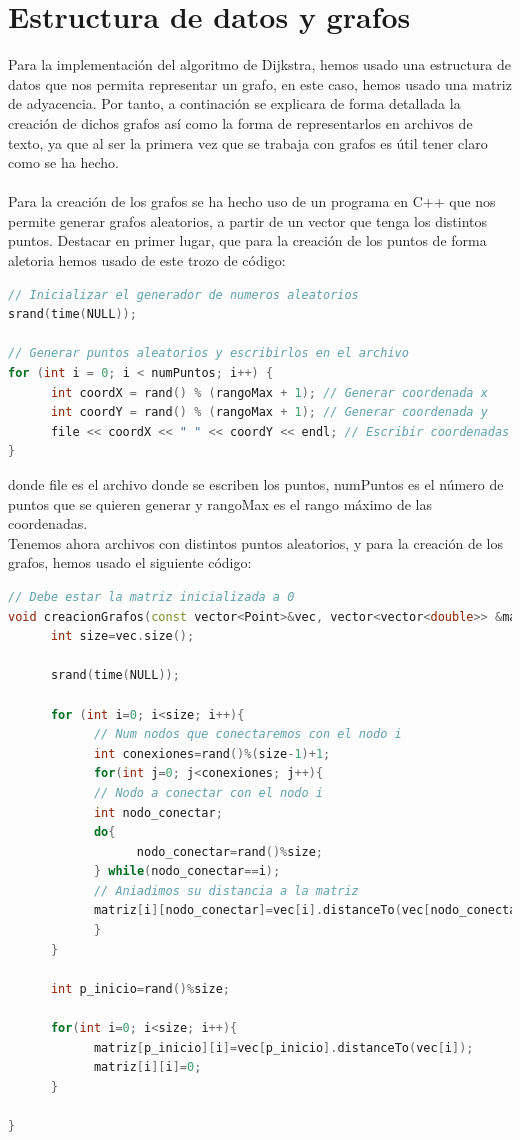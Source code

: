 \documentclass[11pt,openany]{book}
\begin{document}
\section{Estructura de datos y grafos}
Para la implementación del algoritmo de Dijkstra, hemos usado una estructura de datos que nos permita representar un grafo, en este caso,
hemos usado una matriz de adyacencia. Por tanto, a continación se explicara de forma detallada la creación de dichos grafos así como la forma de 
representarlos en archivos de texto, ya que al ser la primera vez que se trabaja con grafos es útil tener
claro como se ha hecho. \\ \\
Para la creación de los grafos se ha hecho uso de un programa en C++ que nos permite generar grafos aleatorios, a partir
de un vector que tenga los distintos puntos. Destacar en primer lugar, que para la creación de los puntos de forma aletoria hemos usado 
de este trozo de código:
\begin{lstlisting}[language=C++]
// Inicializar el generador de numeros aleatorios
srand(time(NULL));

// Generar puntos aleatorios y escribirlos en el archivo
for (int i = 0; i < numPuntos; i++) {
      int coordX = rand() % (rangoMax + 1); // Generar coordenada x
      int coordY = rand() % (rangoMax + 1); // Generar coordenada y
      file << coordX << " " << coordY << endl; // Escribir coordenadas al archivo
}
\end{lstlisting}
donde file es el archivo donde se escriben los puntos, numPuntos es el número de puntos que se quieren generar y rangoMax es el rango
máximo de las coordenadas. \\
Tenemos ahora archivos con distintos puntos aleatorios, y para la creación de los grafos, hemos usado el siguiente código:
\begin{lstlisting}[language=C++]
// Debe estar la matriz inicializada a 0
void creacionGrafos(const vector<Point>&vec, vector<vector<double>> &matriz){
      int size=vec.size();

      srand(time(NULL));

      for (int i=0; i<size; i++){
            // Num nodos que conectaremos con el nodo i
            int conexiones=rand()%(size-1)+1;
            for(int j=0; j<conexiones; j++){
            // Nodo a conectar con el nodo i
            int nodo_conectar;
            do{
                  nodo_conectar=rand()%size;
            } while(nodo_conectar==i);
            // Aniadimos su distancia a la matriz
            matriz[i][nodo_conectar]=vec[i].distanceTo(vec[nodo_conectar]);
            }
      }
      
      int p_inicio=rand()%size;

      for(int i=0; i<size; i++){
            matriz[p_inicio][i]=vec[p_inicio].distanceTo(vec[i]);
            matriz[i][i]=0;
      }

}
\end{lstlisting}
\end{document}
